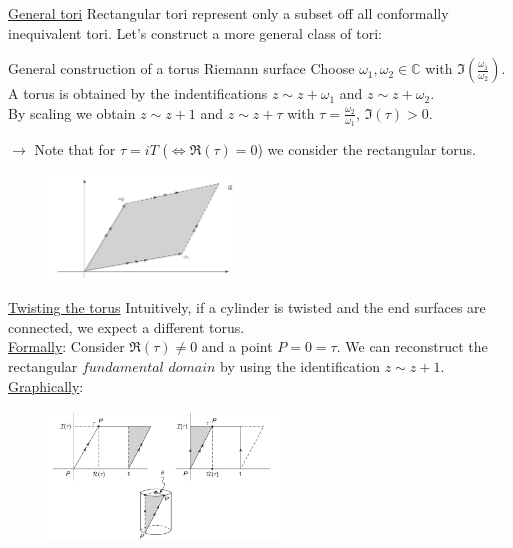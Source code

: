 \documentclass[11pt,aspectratio=169]{beamer}
\begin{document}
\begin{frame}{\underline{General tori}}
	Rectangular tori represent only a subset off all conformally inequivalent tori. Let's construct a more general class of tori:
	\\
	\begin{block}{General construction of a torus Riemann surface}
		Choose $\omega_1, \omega_2 \in \mathbb{C}$ with $\Im(\frac{\omega_1}{\omega_2})$.
		\\
		A torus is obtained by the indentifications $z \sim z + \omega_1$ and $z \sim z + \omega_2$.
		\\
		By scaling we obtain $z \sim z + 1$ and $z \sim z + \tau$ with $\tau = \frac{\omega_2}{\omega_1}$, $\Im(\tau) >0$.
	\end{block}
	$\rightarrow$ Note that for $\tau = iT$ ($\Leftrightarrow \Re(\tau) = 0$) we consider the rectangular torus.
	\begin{figure}[htbp]
		\centering
		\includegraphics[width = 0.45\textwidth]{elements/general torus.PNG}
	\end{figure}
\end{frame}

\begin{frame}{\underline{Twisting the torus}}
	Intuitively, if a cylinder is twisted and the end surfaces are connected, we expect a different torus. 
	\\
	\underline{Formally}: Consider $\Re(\tau) \neq 0$ and a point $P = 0 = \tau$. We can reconstruct the rectangular $\textit{fundamental domain}$ by using the identification $z \sim z + 1$.
	\\
	\underline{Graphically}:
	\begin{figure}[htbp]
		\centering
		\includegraphics[width = 0.55\textwidth]{elements/twisted torus.PNG}
	\end{figure}
	
\end{frame}
\end{document}
